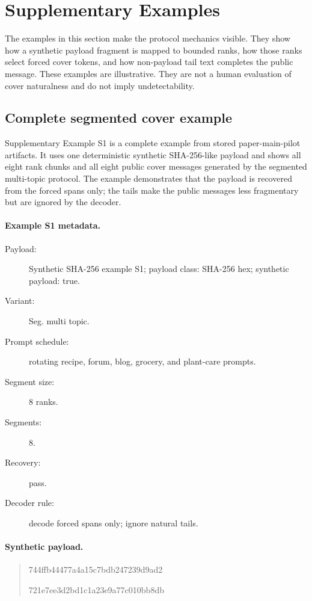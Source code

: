 \documentclass[fleqn,10pt]{wlscirep}
\begin{document}
\section*{Supplementary Examples}

The examples in this section make the protocol mechanics visible. They show how a synthetic payload fragment is mapped to bounded ranks, how those ranks select forced cover tokens, and how non-payload tail text completes the public message. These examples are illustrative. They are not a human evaluation of cover naturalness and do not imply undetectability.

\subsection*{Complete segmented cover example}

Supplementary Example S1 is a complete example from stored paper-main-pilot artifacts. It uses one deterministic synthetic SHA-256-like payload and shows all eight rank chunks and all eight public cover messages generated by the segmented multi-topic protocol. The example demonstrates that the payload is recovered from the forced spans only; the tails make the public messages less fragmentary but are ignored by the decoder.

\paragraph{Example S1 metadata.}
\begin{description}
\item[Payload:] Synthetic SHA-256 example S1; payload class: SHA-256 hex; synthetic payload: true.
\item[Variant:] Seg. multi topic.
\item[Prompt schedule:] rotating recipe, forum, blog, grocery, and plant-care prompts.
\item[Segment size:] 8 ranks.
\item[Segments:] 8.
\item[Recovery:] pass.
\item[Decoder rule:] decode forced spans only; ignore natural tails.
\end{description}

\paragraph{Synthetic payload.}
\begin{quote}
\small\ttfamily\raggedright
744ffb44477a4a15c7bdb247239d9ad2\par
721e7ee3d2bd1c1a23e9a77c010bb8db
\end{quote}
\end{document}
